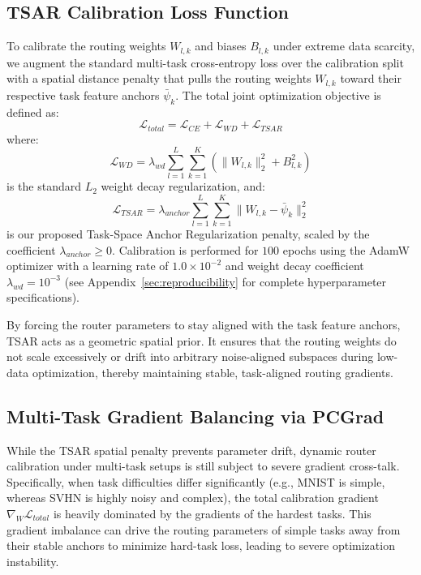 \subsection{TSAR Calibration Loss Function}
To calibrate the routing weights $W_{l, k}$ and biases $B_{l, k}$ under extreme data scarcity, we
augment the standard multi-task cross-entropy loss over the calibration split with a spatial
distance penalty that pulls the routing weights $W_{l, k}$ toward their respective task feature
anchors $\bar{\psi}_k$. The total joint optimization objective is defined as:
\begin{equation}
\mathcal{L}_{total} = \mathcal{L}_{CE} + \mathcal{L}_{WD} + \mathcal{L}_{TSAR}
\label{eq:total_loss}
\end{equation}
where:
\begin{equation}
\mathcal{L}_{WD} = \lambda_{wd} \sum_{l=1}^L \sum_{k=1}^K \left( \|W_{l, k}\|_2^2 + B_{l, k}^2 \right)
\label{eq:l2_wd}
\end{equation}
is the standard $L_2$ weight decay regularization, and:
\begin{equation}
\mathcal{L}_{TSAR} = \lambda_{anchor} \sum_{l=1}^L \sum_{k=1}^K \| W_{l, k} - \bar{\psi}_k \|_2^2
\label{eq:tsar_penalty}
\end{equation}
is our proposed Task-Space Anchor Regularization penalty, scaled by the coefficient
$\lambda_{anchor} \ge 0$. Calibration is performed for $100$ epochs using the AdamW optimizer with a
learning rate of $1.0 \times 10^{-2}$ and weight decay coefficient $\lambda_{wd} = 10^{-3}$ (see
Appendix~\ref{sec:reproducibility} for complete hyperparameter specifications).

By forcing the router parameters to stay aligned with the task feature anchors, TSAR acts as a
geometric spatial prior. It ensures that the routing weights do not scale excessively or drift into
arbitrary noise-aligned subspaces during low-data optimization, thereby maintaining stable,
task-aligned routing gradients.

\subsection{Multi-Task Gradient Balancing via PCGrad}
While the TSAR spatial penalty prevents parameter drift, dynamic router calibration under
multi-task setups is still subject to severe gradient cross-talk. Specifically, when task
difficulties differ significantly (e.g., MNIST is simple, whereas SVHN is highly noisy and complex),
the total calibration gradient $\nabla_{W} \mathcal{L}_{total}$ is heavily dominated by the
gradients of the hardest tasks. This gradient imbalance can drive the routing parameters of simple
tasks away from their stable anchors to minimize hard-task loss, leading to severe optimization
instability.

